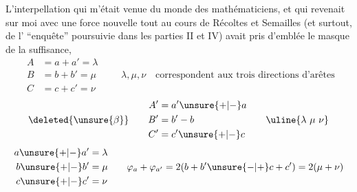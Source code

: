 L'interpellation qui m'était venue du monde des mathématiciens, et qui revenait sur moi avec une force nouvelle tout au cours  de Récoltes et Semailles (et surtout, de l' ``enquête'' poursuivie dans les parties II et IV) avait pris d'emblée le masque de la suffisance,
\[
\begin{aligned}
 A&=a+a'=\lambda\\
 B&=b+b'=\mu\\
 C&=c+c'=\nu
\end{aligned}
\qquad
\boxed{\lambda,\mu,\nu}\quad\text{correspondent aux trois directions d'arêtes}
\]
\[
\deleted{\unsure{\beta}}\qquad
\begin{aligned}
 A'&=a'\unsure{+|-}a\\
 B'&=b'-b\\
 C'&=c'\unsure{+|-}c
\end{aligned}
\qquad\uline{\lambda\ \mu\ \nu}
\]
\[
\begin{aligned}
 a\unsure{+|-}a'&=\lambda\\
 b\unsure{+|-}b'&=\mu\\
 c\unsure{+|-}c'&=\nu
\end{aligned}
\qquad
\varphi_a+\varphi_{a'}=2(b+b'\unsure{-|+}c+c')=2(\mu+\nu)
\]
